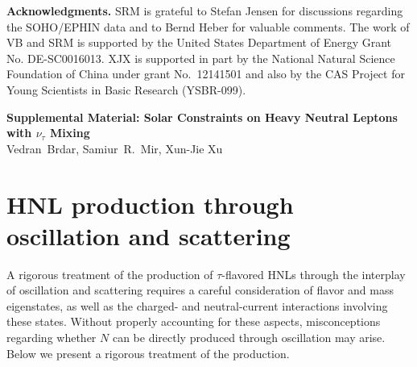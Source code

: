 \documentclass[aps,prd,twocolumn,preprintnumbers,superscriptaddress,nofootinbib]{revtex4-1}
\begin{document}
\textbf{Acknowledgments.} 
\noindent
SRM is grateful to Stefan Jensen for discussions regarding the SOHO/EPHIN data and to Bernd Heber for valuable comments. The work of VB and SRM is supported by the United States Department of Energy Grant No. DE-SC0016013.  XJX is supported in part by the National Natural Science Foundation of China under grant No.~12141501 and also by the CAS Project for Young Scientists in Basic Research (YSBR-099). 












\clearpage
\newpage
\onecolumngrid


\setcounter{equation}{0}
\setcounter{figure}{0}
\setcounter{table}{0}
\setcounter{page}{1}
\setcounter{section}{0}

\makeatletter
\renewcommand{\thesection}{S\arabic{section}}
\renewcommand{\theequation}{S\arabic{equation}}
\renewcommand{\thefigure}{S\arabic{figure}}
\renewcommand{\thetable}{S\arabic{table}}

\renewcommand{\theHfigure}{S\arabic{figure}}
\renewcommand{\theHtable}{S\arabic{table}}
\renewcommand{\theHequation}{S\arabic{equation}}
\makeatother

\begin{center}
    \textbf{\large Supplemental Material: Solar Constraints on Heavy Neutral Leptons with $\nu_\tau$ Mixing} \\ 
    \vspace{0.5cm}
    {Vedran~Brdar, Samiur~R.~Mir, Xun-Jie Xu}
\end{center}

\section{HNL production through oscillation and scattering \label{sec:HNLSupp}}

A rigorous treatment of the production of $\tau$-flavored HNLs through
the interplay of oscillation and scattering requires a careful consideration
of flavor and mass eigenstates, as well as the charged- and neutral-current
interactions involving these states. Without properly accounting for
these aspects, misconceptions regarding whether $N$ can be
directly produced through oscillation may arise. Below we present
a rigorous treatment of the production. 
\end{document}
